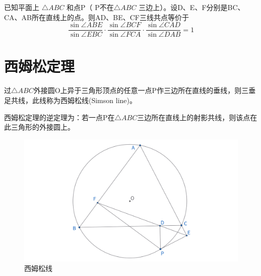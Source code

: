 \begin{theorem}[角元形式赛瓦定理]
    已知平面上 $\triangle A B C$ 和点P（ P不在$\triangle A B C$ 三边上）。设D、E、F分别是BC、CA、AB所在直线上的点。则AD、BE、CF三线共点等价于
    $$
    \frac{\sin \angle ABE}{\sin \angle EBC}
    \cdot 
    \frac{\sin \angle BCF}{\sin \angle FCA}
    \cdot 
    \frac{\sin \angle CAD}{\sin \angle DAB}
    =1
    $$
\end{theorem}


\newpage 
\section{西姆松定理}
\begin{theorem}
过$\triangle ABC$外接圆O上异于三角形顶点的任意一点P作三边所在直线的垂线，则三垂足共线，此线称为西姆松线(Simson line)。

西姆松定理的逆定理为：若一点P在$\triangle ABC$三边所在直线上的射影共线，则该点在此三角形的外接圆上。
\end{theorem}

\begin{figure}[H]
    \centering
    \includegraphics[width=\linewidth]{figures/西姆松线.png}
    \caption{西姆松线}
\end{figure}


\newpage
